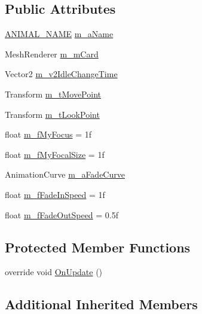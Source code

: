 \subsection*{Public Attributes}
\begin{DoxyCompactItemize}
\item 
\mbox{\hyperlink{_animal_8cs_a2fa5713399b84d1b88dae9196837af50}{A\+N\+I\+M\+A\+L\+\_\+\+N\+A\+ME}} \mbox{\hyperlink{class_menu_animal_a1f992fbd56582de1dd6c775df7a42a9d}{m\+\_\+a\+Name}}
\item 
Mesh\+Renderer \mbox{\hyperlink{class_menu_animal_aadbe4f7b8bc5435df938fcb60c7512b1}{m\+\_\+m\+Card}}
\item 
Vector2 \mbox{\hyperlink{class_menu_animal_ad9a9374b6b22d367c2bd03ec1975803f}{m\+\_\+v2\+Idle\+Change\+Time}}
\item 
Transform \mbox{\hyperlink{class_menu_animal_a86791e8d71a6b05e0a150c00b596d41f}{m\+\_\+t\+Move\+Point}}
\item 
Transform \mbox{\hyperlink{class_menu_animal_a8f393c86c3167e544f9e5b08d42d62a9}{m\+\_\+t\+Look\+Point}}
\item 
float \mbox{\hyperlink{class_menu_animal_a0ece6136ee2ff46afed9c56db4c47db8}{m\+\_\+f\+My\+Focus}} = 1f
\item 
float \mbox{\hyperlink{class_menu_animal_a07010a4315637bc6ccb5e02d973e0ab5}{m\+\_\+f\+My\+Focal\+Size}} = 1f
\item 
Animation\+Curve \mbox{\hyperlink{class_menu_animal_ad5b6ceaf1c5e8e4e95202bd736aa0dec}{m\+\_\+a\+Fade\+Curve}}
\item 
float \mbox{\hyperlink{class_menu_animal_a73320f01ac958476e82abcaa89be38de}{m\+\_\+f\+Fade\+In\+Speed}} = 1f
\item 
float \mbox{\hyperlink{class_menu_animal_a90701c4ea4beda689faadd60d291116d}{m\+\_\+f\+Fade\+Out\+Speed}} = 0.\+5f
\end{DoxyCompactItemize}
\subsection*{Protected Member Functions}
\begin{DoxyCompactItemize}
\item 
override void \mbox{\hyperlink{class_menu_animal_a896a3eaf9bf263688597a8652ac7469c}{On\+Update}} ()
\end{DoxyCompactItemize}
\subsection*{Additional Inherited Members}


